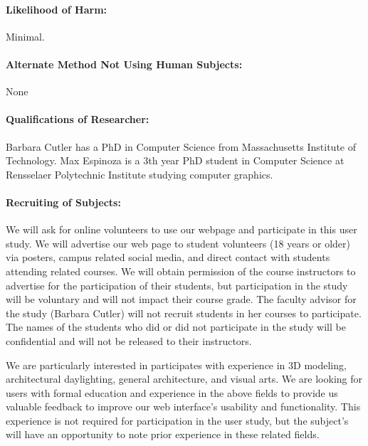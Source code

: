 \documentclass[12pt]{article}
\begin{document}
\paragraph{Likelihood of  Harm:}   Minimal.
\paragraph{Alternate Method Not Using Human Subjects:} None

\paragraph{Qualifications of Researcher:}
Barbara Cutler has a PhD in Computer Science from Massachusetts
Institute of Technology.  Max Espinoza is a 3th year PhD student in
Computer Science at Rensselaer Polytechnic Institute studying computer
graphics.

\paragraph{Recruiting of Subjects:}
We will ask for online volunteers to use our webpage and participate in this
user study. We will advertise our web page to student volunteers (18 years or older) 
via posters, campus related social media, and direct contact with students attending 
related courses. We will obtain permission of the course instructors to advertise 
for the participation of their students, but participation in the study will be 
voluntary and will not impact their course grade. The faculty advisor for the 
study (Barbara Cutler) will not recruit students in her courses to participate.  
The names of the students who did or did not participate in the study will be 
confidential and will not be released to their instructors.

We are particularly interested in participates with experience in 3D modeling, 
architectural daylighting, general architecture, and visual arts. We are looking 
for users with formal education and experience in the above fields to provide 
us valuable feedback to improve our web interface's usability and functionality. 
This experience is not required for participation in the user study, but the 
subject's will have an opportunity to note prior experience in these related fields.
\end{document}

